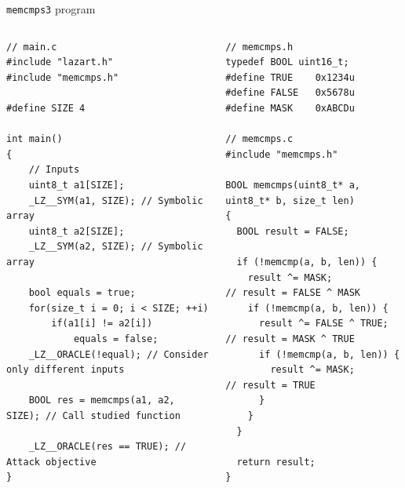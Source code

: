 \begin{frame}{\texttt{memcmps3} program} 
    \begin{columns}
        \begin{column}{0.5\textwidth}
            \lstset{style=customc}
            \begin{lstlisting}
// main.c
#include "lazart.h"
#include "memcmps.h"

#define SIZE 4

int main()
{  
    // Inputs
    uint8_t a1[SIZE];
    _LZ__SYM(a1, SIZE); // Symbolic array
    uint8_t a2[SIZE];
    _LZ__SYM(a2, SIZE); // Symbolic array
    
    bool equals = true;
    for(size_t i = 0; i < SIZE; ++i)
        if(a1[i] != a2[i])
            equals = false;
    _LZ__ORACLE(!equal); // Consider only different inputs
    
    BOOL res = memcmps(a1, a2, SIZE); // Call studied function

    _LZ__ORACLE(res == TRUE); // Attack objective
}
            \end{lstlisting}
        \end{column}
        \begin{column}{0.5\textwidth}
            \lstset{style=customc}
            \begin{lstlisting}
// memcmps.h
typedef BOOL uint16_t;
#define TRUE    0x1234u
#define FALSE   0x5678u
#define MASK    0xABCDu

// memcmps.c
#include "memcmps.h"

BOOL memcmps(uint8_t* a, uint8_t* b, size_t len)
{
  BOOL result = FALSE;
  
  if (!memcmp(a, b, len)) {
    result ^= MASK;           // result = FALSE ^ MASK
    if (!memcmp(a, b, len)) {
      result ^= FALSE ^ TRUE; // result = MASK ^ TRUE
      if (!memcmp(a, b, len)) {
        result ^= MASK;       // result = TRUE
      }
    }
  }

  return result;
}
            \end{lstlisting}
        \end{column}
    \end{columns}
\end{frame}


